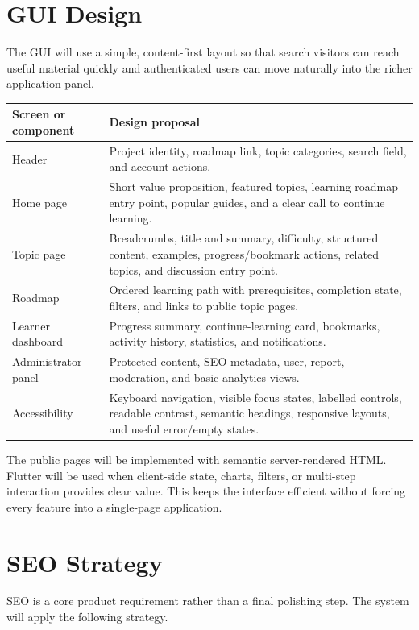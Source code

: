 \documentclass[11pt,a4paper]{article}
\begin{document}
\section{GUI Design}

The GUI will use a simple, content-first layout so that search visitors can reach
useful material quickly and authenticated users can move naturally into the richer
application panel.

\begin{tabularx}{\linewidth}{@{}p{.25\linewidth}X@{}}
\toprule
\textbf{Screen or component} & \textbf{Design proposal}\\
\midrule
Header & Project identity, roadmap link, topic categories, search field, and account actions.\\
Home page & Short value proposition, featured topics, learning roadmap entry point,
popular guides, and a clear call to continue learning.\\
Topic page & Breadcrumbs, title and summary, difficulty, structured content, examples,
progress/bookmark actions, related topics, and discussion entry point.\\
Roadmap & Ordered learning path with prerequisites, completion state, filters, and
links to public topic pages.\\
Learner dashboard & Progress summary, continue-learning card, bookmarks, activity
history, statistics, and notifications.\\
Administrator panel & Protected content, SEO metadata, user, report, moderation, and
basic analytics views.\\
Accessibility & Keyboard navigation, visible focus states, labelled controls, readable
contrast, semantic headings, responsive layouts, and useful error/empty states.\\
\bottomrule
\end{tabularx}

The public pages will be implemented with semantic server-rendered HTML. Flutter
will be used when client-side state, charts, filters, or multi-step interaction
provides clear value. This keeps the interface efficient without forcing every
feature into a single-page application.

\section{SEO Strategy}

SEO is a core product requirement rather than a final polishing step. The system
will apply the following strategy.
\end{document}
